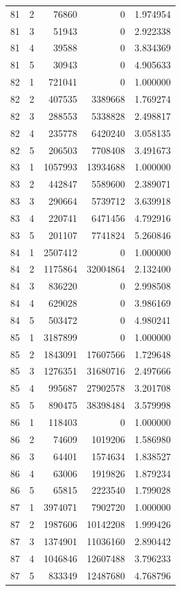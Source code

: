 \begin{longtable}{rrrrr}
81 & 2 & 76860 & 0 & 1.974954 \\
81 & 3 & 51943 & 0 & 2.922338 \\
81 & 4 & 39588 & 0 & 3.834369 \\
81 & 5 & 30943 & 0 & 4.905633 \\
82 & 1 & 721041 & 0 & 1.000000 \\
82 & 2 & 407535 & 3389668 & 1.769274 \\
82 & 3 & 288553 & 5338828 & 2.498817 \\
82 & 4 & 235778 & 6420240 & 3.058135 \\
82 & 5 & 206503 & 7708408 & 3.491673 \\
83 & 1 & 1057993 & 13934688 & 1.000000 \\
83 & 2 & 442847 & 5589600 & 2.389071 \\
83 & 3 & 290664 & 5739712 & 3.639918 \\
83 & 4 & 220741 & 6471456 & 4.792916 \\
83 & 5 & 201107 & 7741824 & 5.260846 \\
84 & 1 & 2507412 & 0 & 1.000000 \\
84 & 2 & 1175864 & 32004864 & 2.132400 \\
84 & 3 & 836220 & 0 & 2.998508 \\
84 & 4 & 629028 & 0 & 3.986169 \\
84 & 5 & 503472 & 0 & 4.980241 \\
85 & 1 & 3187899 & 0 & 1.000000 \\
85 & 2 & 1843091 & 17607566 & 1.729648 \\
85 & 3 & 1276351 & 31680716 & 2.497666 \\
85 & 4 & 995687 & 27902578 & 3.201708 \\
85 & 5 & 890475 & 38398484 & 3.579998 \\
86 & 1 & 118403 & 0 & 1.000000 \\
86 & 2 & 74609 & 1019206 & 1.586980 \\
86 & 3 & 64401 & 1574634 & 1.838527 \\
86 & 4 & 63006 & 1919826 & 1.879234 \\
86 & 5 & 65815 & 2223540 & 1.799028 \\
87 & 1 & 3974071 & 7902720 & 1.000000 \\
87 & 2 & 1987606 & 10142208 & 1.999426 \\
87 & 3 & 1374901 & 11036160 & 2.890442 \\
87 & 4 & 1046846 & 12607488 & 3.796233 \\
87 & 5 & 833349 & 12487680 & 4.768796 \\

\end{longtable}
